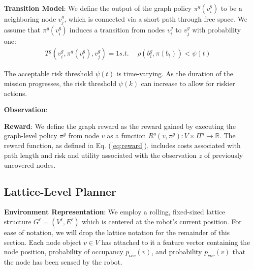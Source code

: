 \documentclass{article}
\newcommand{\ph}[1]{{\textbf{#1}:}} %
\begin{document}
\ph{Transition Model} We define the output of the graph policy $\pi^g(v_i^g)$ to be a neighboring node $v_j^g$, which is connected via a short path through free space. We assume that $\pi^{g}(v_i^g)$ induces a transition from nodes $v_i^g$ to $v_j^g$ with probability one:
\begin{align}
    T^{g} (v_i^g, \pi^g(v_i^g), v_j^g) = 1
    s.t.~&~\rho(b_t^g,\pi(b_t)) < \psi(t)
\end{align}

The acceptable risk threshold $\psi(t)$ is time-varying. As the duration of the mission progresses, the risk threshold $\psi(k)$ can increase to allow for riskier actions.

\ph{Observation}

\ph{Reward} We define the graph reward as the reward gained by executing the graph-level policy $\pi^g$ from node $v$ as a function $R^g(v, \pi^g): V \times \Pi^g \to \mathbb{R}$. The reward function, as defined in Eq. (\ref{eq:reward}), includes costs associated with path length and risk and utility associated with the observation $z$ of previously uncovered nodes. 


\subsection{Lattice-Level Planner} 

\ph{Environment Representation} We employ a rolling, fixed-sized lattice structure $G^\ell = (V^\ell, E^\ell)$ which is centered at the robot's current position. For ease of notation, we will drop the lattice notation for the remainder of this section. Each node object $v \in V$ has attached to it a feature vector containing the node position, probability of occupancy $p_{occ}(v)$, and probability $p_{cov}(v)$ that the node has been sensed by the robot. 
\end{document}
